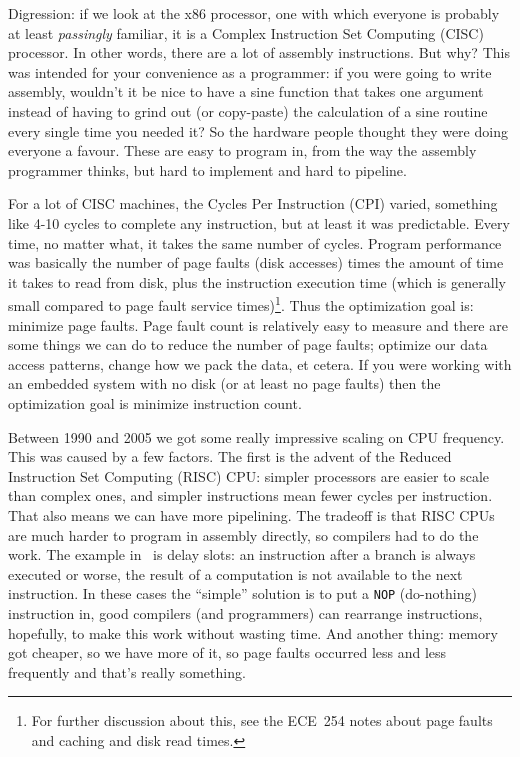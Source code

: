 \documentclass[a4paper]{report}
\begin{document}
Digression: if we look at the x86 processor, one with which everyone is probably at least \textit{passingly} familiar, it is a Complex Instruction Set Computing (CISC) processor. In other words, there are a lot of assembly instructions. But why? This was intended for your convenience as a programmer: if you were going to write assembly, wouldn't it be nice to have a sine function that takes one argument instead of having to grind out (or copy-paste) the calculation of a sine routine every single time you needed it? So the hardware people thought they were doing everyone a favour. These are easy to program in, from the way the assembly programmer thinks, but hard to implement and hard to pipeline. 

For a lot of CISC machines, the Cycles Per Instruction (CPI) varied, something like 4-10 cycles to complete any instruction, but at least it was predictable. Every time, no matter what, it takes the same number of cycles. Program performance was basically the number of page faults (disk accesses) times the amount of time it takes to read from disk, plus the instruction execution time (which is generally small compared to page fault service times)\footnote{For further discussion about this, see the ECE~254 notes about page faults and caching and disk read times.}. Thus the optimization goal is: minimize page faults. Page fault count is relatively easy to measure and there are some things we can do to reduce the number of page faults; optimize our data access patterns, change how we pack the data, et cetera. If you were working with an embedded system with no disk (or at least no page faults) then the optimization goal is minimize instruction count.

Between 1990 and 2005 we got some really impressive scaling on CPU frequency. This was caused by a few factors. The first is the advent of the Reduced Instruction Set Computing (RISC) CPU: simpler processors are easier to scale than complex ones, and simpler instructions mean fewer cycles per instruction. That also means we can have more pipelining. The tradeoff is that RISC CPUs are much harder to program in assembly directly, so compilers had to do the work. The example in~\cite{modern-hardware} is delay slots: an instruction after a branch is always executed or worse, the result of a computation is not available to the next instruction. In these cases the ``simple'' solution is to put a \texttt{NOP} (do-nothing) instruction in, good compilers (and programmers) can rearrange instructions, hopefully, to make this work without wasting time. And another thing: memory got cheaper, so we have more of it, so page faults occurred less and less frequently and that's really something.
\end{document}

